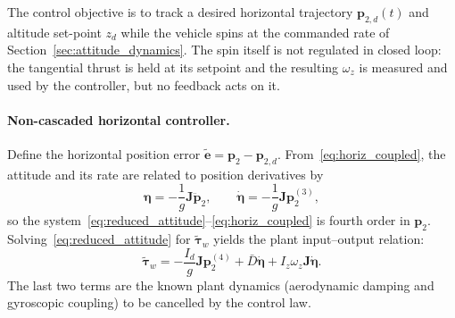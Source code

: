 The control objective is to track a desired horizontal trajectory
$\boldsymbol{p}_{2,d}(t)$ and altitude set-point $z_d$ while the vehicle spins
at the commanded rate of Section~\ref{sec:attitude_dynamics}.  The spin itself
is not regulated in closed loop: the tangential thrust is held at its setpoint
and the resulting $\omega_z$ is measured and used by the controller, but no
feedback acts on it.

\paragraph{Non-cascaded horizontal controller.}
Define the horizontal position error $\tilde{\boldsymbol{e}} =
\boldsymbol{p}_2 - \boldsymbol{p}_{2,d}$.  From~\eqref{eq:horiz_coupled},
the attitude and its rate are related to position derivatives by
\begin{equation}
    \boldsymbol{\eta} = -\frac{1}{g}\boldsymbol{J}\ddot{\boldsymbol{p}}_2,
    \qquad
    \dot{\boldsymbol{\eta}} = -\frac{1}{g}\boldsymbol{J}\boldsymbol{p}_2^{(3)},
    \label{eq:eta_from_p2}
\end{equation}
so the system~\eqref{eq:reduced_attitude}--\eqref{eq:horiz_coupled} is fourth
order in $\boldsymbol{p}_2$.  Solving~\eqref{eq:reduced_attitude} for
$\tilde{\boldsymbol{\tau}}_w$ yields the plant input--output relation:
\begin{equation}
    \tilde{\boldsymbol{\tau}}_w
        = -\frac{I_d}{g}\boldsymbol{J}\boldsymbol{p}_2^{(4)}
          + \bar{D}\dot{\boldsymbol{\eta}}
          + I_z\omega_z\boldsymbol{J}\dot{\boldsymbol{\eta}}.
    \label{eq:ctrl_inversion}
\end{equation}
The last two terms are the known plant dynamics (aerodynamic damping and gyroscopic coupling) to be cancelled by the control law.

